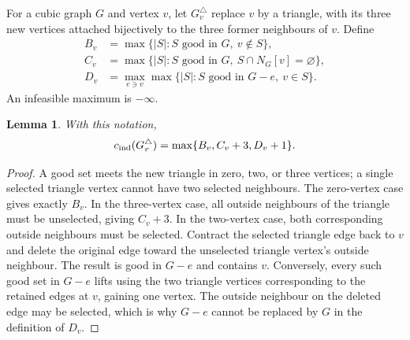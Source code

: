 \documentclass[11pt]{article}
\newtheorem{lemma}[theorem]{Lemma}
\begin{document}
For a cubic graph $G$ and vertex $v$, let $G^\triangle_v$ replace
$v$ by a triangle, with its three new vertices attached bijectively
to the three former neighbours of $v$. Define
\[
\begin{split}
 B_v&=\max\{|S|:S\text{ good in }G,\ v\notin S\},\\
 C_v&=\max\{|S|:S\text{ good in }G,\ S\cap N_G[v]=\varnothing\},\\
 D_v&=\max_{e\ni v}\max\{|S|:S\text{ good in }G-e,\ v\in S\}.
\end{split}
\]
An infeasible maximum is $-\infty$.
\begin{lemma}\label{lem:vertex-triangle-exact}
With this notation,
\[
 c_{\rm ind}(G^\triangle_v)=\max\{B_v,C_v+3,D_v+1\}.
\]
\end{lemma}
\begin{proof}
A good set meets the new triangle in zero, two, or three vertices;
a single selected triangle vertex cannot have two selected neighbours.
The zero-vertex case gives exactly $B_v$. In the three-vertex case,
all outside neighbours of the triangle must be unselected, giving
$C_v+3$. In the two-vertex case, both corresponding outside neighbours
must be selected. Contract the selected triangle edge back to $v$
and delete the original edge toward the unselected triangle vertex's
outside neighbour. The result is good in $G-e$ and contains $v$.
Conversely, every such good set in $G-e$ lifts using the two triangle
vertices corresponding to the retained edges at $v$, gaining one
vertex. The outside neighbour on the deleted edge may be selected,
which is why $G-e$ cannot be replaced by $G$ in the definition of
$D_v$.
\end{proof}
\end{document}
